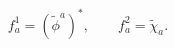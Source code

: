\begin{equation}
f^1_a
=
\left(\tilde \phi^a\right)^*, 
\qquad
f^2_a=\tilde \chi_a. 
\label{eq:HSF-N1O2}
\end{equation} 
